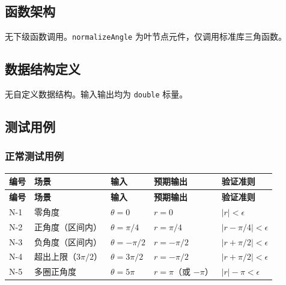 \documentclass[a4paper,10pt]{article}
\begin{document}
\subsection{函数架构}

无下级函数调用。\texttt{normalizeAngle} 为叶节点元件，仅调用标准库三角函数。

\subsection{数据结构定义}

无自定义数据结构。输入输出均为 \texttt{double} 标量。

\subsection{测试用例}

\subsubsection{正常测试用例}

{\small
\begin{longtable}{|C{0.6cm}|L{2.2cm}|L{4.5cm}|L{3.5cm}|L{3.8cm}|}
\hline
\textbf{编号} & \textbf{场景} & \textbf{输入} & \textbf{预期输出} & \textbf{验证准则} \\
\hline
\endfirsthead
\hline
\textbf{编号} & \textbf{场景} & \textbf{输入} & \textbf{预期输出} & \textbf{验证准则} \\
\hline
\endhead
N-1 &
零角度 &
$\theta{=}0$ &
$r = 0$ &
$|r| < \epsilon$ \\
\hline
N-2 &
正角度（区间内） &
$\theta{=}\pi/4$ &
$r = \pi/4$ &
$|r - \pi/4| < \epsilon$ \\
\hline
N-3 &
负角度（区间内） &
$\theta{=}{-}\pi/2$ &
$r = -\pi/2$ &
$|r + \pi/2| < \epsilon$ \\
\hline
N-4 &
超出上限（$3\pi/2$） &
$\theta{=}3\pi/2$ &
$r = -\pi/2$ &
$|r + \pi/2| < \epsilon$ \\
\hline
N-5 &
多圈正角度 &
$\theta{=}5\pi$ &
$r = \pi$（或 $-\pi$） &
$|r| - \pi < \epsilon$ \\
\hline
\end{longtable}
}
\end{document}
